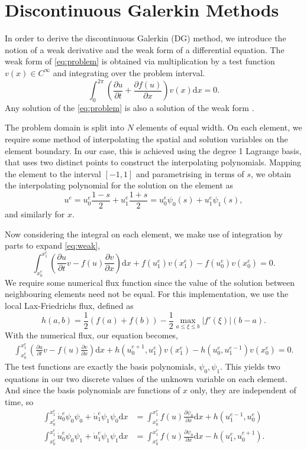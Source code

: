 \section{Discontinuous Galerkin Methods}

In order to derive the discontinuous Galerkin (DG) method, we introduce the notion of a weak derivative and the weak form of a differential equation.
The weak form of \eqref{eq:problem} is obtained via multiplication by a test function $v(x) \in C^\infty$ and integrating over the problem interval.
\[
	\int_0^{2\pi} \left( \frac{\partial u}{\partial t} + \frac{\partial f(u)}{\partial x} \right) v(x) \mathrm{d} x = 0. \label{eq:weak}
\]
Any solution of the \ref{eq:problem} is also a solution of the weak form \cite{leveque1992numerical}.

The problem domain is split into $N$ elements of equal width.
On each element, we require some method of interpolating the spatial and solution variables on the element boundary.
In our case, this is achieved using the degree 1 Lagrange basis, that uses two distinct points to construct the interpolating polynomials.
Mapping the element to the interval $[-1,1]$ and parametrising in terms of $s$, we obtain the interpolating polynomial for the solution on the element as
\[
	u^e = u_0^e \frac{1-s}{2} + u_1^e \frac{1+s}{2} = u_0^e \psi_0(s) + u_1^e \psi_1(s),
\]
and similarly for $x$.

Now considering the integral on each element, we make use of integration by parts to expand \eqref{eq:weak},
\[
	\int_{x_0^e}^{x_1^e} \left( \frac{\partial u}{\partial t} v - f(u) \frac{\partial v}{\partial x} \right) \mathrm{d} x +f(u_1^e)v(x_1^e)-f(u_0^e)v(x_0^e) = 0.
\]
We require some numerical flux function since the value of the solution between neighbouring elements need not be equal.
For this implementation, we use the local Lax-Friedrichs flux, defined as
\[
	h(a,b) = \frac{1}{2} \left( f(a) + f(b) \right) - \frac{1}{2}\max_{a\leq \xi \leq b} \lvert f'(\xi) \rvert \left( b - a \right).
\]
With the numerical flux, our equation becomes,
\begin{align*}
	\int_{x_0^e}^{x_1^e} \left( \frac{\partial u}{\partial t} v - f(u) \frac{\partial v}{\partial x} \right) \mathrm{d} x +h(u_0^{e+1},u_1^e)v(x_1^e)-h(u_0^e, u_1^{e-1})v(x_0^e) = 0.
\end{align*}
The test functions are exactly the basis polynomials, $\psi_0, \psi_1$. This yields two equations in our two discrete values of the unknown variable on each element. And since the basis polynomials are functions of $x$ only, they are independent of time, so
\begin{align*}
	\int_{x_0^e}^{x_1^e}  \dot{u}_0^e \psi_0\psi_0 + \dot{u}_1^e \psi_1\psi_0 \mathrm{d} x 
    &= \int_{x_0^e}^{x_1^e} f(u) \frac{\partial \psi_0}{\partial x} \mathrm{d} x + h(u_1^{e-1}, u_0^e) \\
    \int_{x_0^e}^{x_1^e}  \dot{u}_0^e \psi_0\psi_1 + \dot{u}_1^e \psi_1\psi_1 \mathrm{d} x 
    &= \int_{x_0^e}^{x_1^e} f(u) \frac{\partial \psi_0}{\partial x} \mathrm{d} x - h(u_1^e, u_0^{e+1}).
\end{align*}

